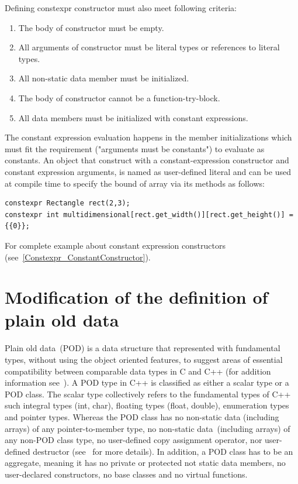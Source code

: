\documentclass[11pt]{report}
\begin{document}
 Defining constexpr constructor must also meet following criteria:
\begin{enumerate}
\item	The body of constructor must be empty.
\item	All arguments of constructor must be literal types or references to literal types.
\item   All non-static data member must be initialized.
\item	The body of constructor cannot be a function-try-block.
\item	All data members must be initialized with constant expressions.
\end{enumerate}

The constant expression evaluation happens in the member initializations which must fit the requirement ("arguments must be constants") to evaluate as constants. An object that construct with a constant-expression constructor and constant expression arguments, is named as user-defined literal and can be used at compile time to specify the bound of array via its methods as follows:
\begin{lstlisting}
constexpr Rectangle rect(2,3);
constexpr int multidimensional[rect.get_width()][rect.get_height()] = {{0}};
\end{lstlisting}
For complete example about constant expression constructors (see~\ref{Constexpr_ConstantConstructor}).

\section{Modification of the definition of plain old data}
\label{section: Modification of the definition of plain old data}
Plain old data~(POD) is a data structure that represented with fundamental types, without using the object oriented features, to suggest areas of essential compatibility between comparable data types in C and C++ (for addition information see~\cite{Stroustrup:2012:Cpp11}). A POD type in C++ is classified as either a scalar type or a POD class. The scalar type collectively refers to the fundamental types of C++ such integral types (int, char), floating types (float, double), enumeration types and pointer types. Whereas the POD class has no non-static data (including arrays) of any pointer-to-member type, no non-static data~(including arrays) of any non-POD class type, no user-defined copy assignment operator, nor user-defined destructor (see~\cite{MSDN:2012:CppModern} for more details). In addition, a POD class has to be an aggregate, meaning it has no private or protected not static data members, no user-declared constructors, no base classes and no virtual functions.
\end{document}

